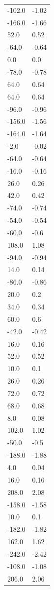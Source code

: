 \begin{longtable}{ll}
-102.0 & -1.02 \\
-166.0 & -1.66 \\
52.0 & 0.52 \\
-64.0 & -0.64 \\
0.0 & 0.0 \\
-78.0 & -0.78 \\
64.0 & 0.64 \\
64.0 & 0.64 \\
-96.0 & -0.96 \\
-156.0 & -1.56 \\
-164.0 & -1.64 \\
-2.0 & -0.02 \\
-64.0 & -0.64 \\
-16.0 & -0.16 \\
26.0 & 0.26 \\
42.0 & 0.42 \\
-74.0 & -0.74 \\
-54.0 & -0.54 \\
-60.0 & -0.6 \\
108.0 & 1.08 \\
-94.0 & -0.94 \\
14.0 & 0.14 \\
-86.0 & -0.86 \\
20.0 & 0.2 \\
34.0 & 0.34 \\
60.0 & 0.6 \\
-42.0 & -0.42 \\
16.0 & 0.16 \\
52.0 & 0.52 \\
10.0 & 0.1 \\
26.0 & 0.26 \\
72.0 & 0.72 \\
68.0 & 0.68 \\
8.0 & 0.08 \\
102.0 & 1.02 \\
-50.0 & -0.5 \\
-188.0 & -1.88 \\
4.0 & 0.04 \\
16.0 & 0.16 \\
208.0 & 2.08 \\
-158.0 & -1.58 \\
10.0 & 0.1 \\
-182.0 & -1.82 \\
162.0 & 1.62 \\
-242.0 & -2.42 \\
-108.0 & -1.08 \\
206.0 & 2.06 \\

\end{longtable}
